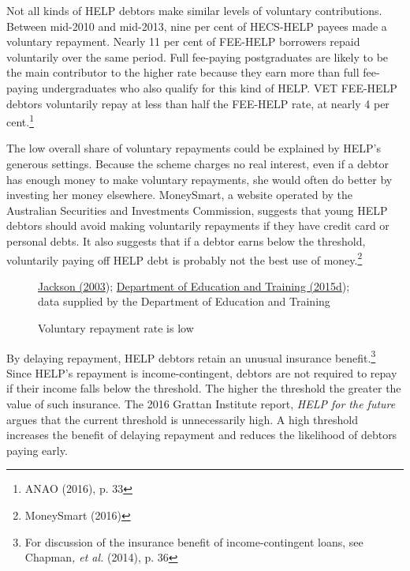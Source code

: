 \documentclass[embargoed]{grattan}
\begin{document}
Not all kinds of HELP debtors make similar levels of voluntary contributions. Between mid-2010 and mid-2013, nine per cent of HECS-HELP payees made a voluntary repayment. Nearly 11 per cent of FEE-HELP borrowers repaid voluntarily over the same period. Full fee-paying postgraduates are likely to be the main contributor to the higher rate because they earn more than full fee-paying undergraduates who also qualify for this kind of HELP. VET FEE-HELP debtors voluntarily repay at less than half the FEE-HELP rate, at nearly 4 per cent.\footnote{ANAO (2016), p. 33}

The low overall share of voluntary repayments could be explained by HELP's generous settings. Because the scheme charges no real interest, even if a debtor has enough money to make voluntary repayments, she would often do better by investing her money elsewhere. MoneySmart, a website operated by the Australian Securities and Investments Commission, suggests that young HELP debtors should avoid making voluntarily repayments if they have credit card or personal debts. It also suggests that if a debtor earns below the threshold, voluntarily paying off HELP debt is probably not the best use of money.\footnote{MoneySmart (2016)}

\begin{figure}
\caption{Voluntary repayment rate is low}\label{fig:fig8-voluntary-repayment-rate-is-low}

{\protect\hyperlink{_ENREF_50}{Jackson (2003}); \protect\hyperlink{_ENREF_27}{Department of Education and Training (2015d}); data supplied by the Department of Education and Training}
\end{figure}

By delaying repayment, HELP debtors retain an unusual insurance benefit.\footnote{For discussion of the insurance benefit of income-contingent loans, see Chapman\emph{, et al.} (2014), p. 36} Since HELP's repayment is income-contingent, debtors are not required to repay if their income falls below the threshold. The higher the threshold the greater the value of such insurance. The 2016 Grattan Institute report, \emph{HELP for the future} argues that the current threshold is unnecessarily high. A high threshold increases the benefit of delaying repayment and reduces the likelihood of debtors paying early.
\end{document}
